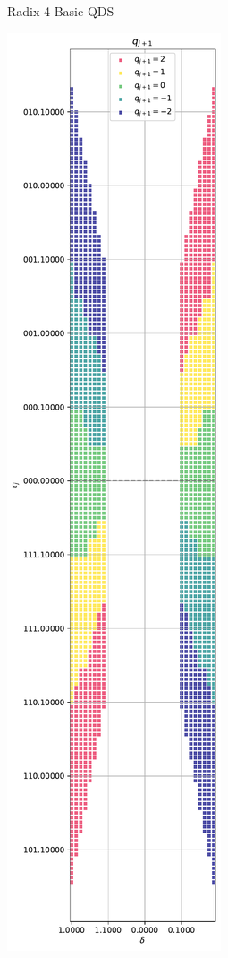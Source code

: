 \documentclass{article}
\begin{document}
\begin{figure}[htbp]
\begin{subfigure}[b]{0.32\textwidth}
    \caption{Radix-4 Basic QDS}
    \label{fig:division:radix4_basic}
  \end{subfigure}
  \hfill
  \begin{subfigure}[b]{0.32\textwidth}
    \centering
    \includegraphics[width=\textwidth, height=3.5\textwidth, keepaspectratio=true]{../figures/division/radix4_qds_optimized_quadrants_1_2_3_4.pdf}

\end{subfigure}
\end{figure}
\end{document}
